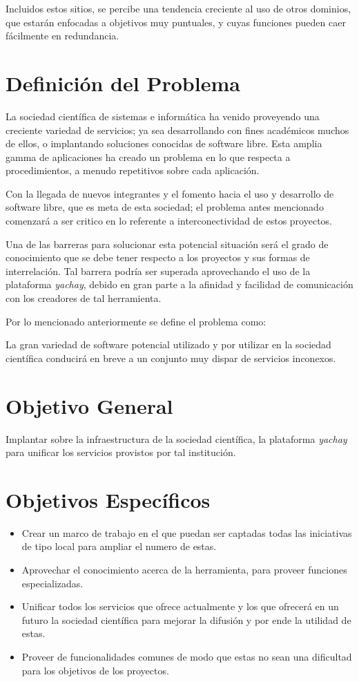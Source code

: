 \documentclass[letter,12pt]{article}
\begin{document}
Incluidos estos sitios, se percibe una tendencia creciente al uso de otros dominios, que estarán 
enfocadas a objetivos muy puntuales, y cuyas funciones pueden caer fácilmente en redundancia.

\section{Definición del Problema}
La sociedad científica de sistemas e informática ha venido proveyendo una creciente variedad de servicios; ya sea desarrollando con fines académicos muchos de ellos, o implantando
soluciones conocidas de software libre. Esta amplia gamma de aplicaciones ha creado un problema en lo que respecta a procedimientos, a menudo repetitivos sobre cada aplicación.

Con la llegada de nuevos integrantes y el fomento hacia el uso y desarrollo de software libre, que
es meta de esta sociedad; el problema antes mencionado comenzará a ser critico en lo referente a
interconectividad de estos proyectos.

Una de las barreras para solucionar esta potencial situación será el grado de conocimiento que se
debe tener respecto a los proyectos y sus formas de interrelación. Tal barrera podría ser superada
aprovechando el uso de la plataforma \emph{yachay}, debido en gran parte a la afinidad y facilidad
de comunicación con los creadores de tal herramienta.

Por lo mencionado anteriormente se define el problema como:

La gran variedad de software potencial utilizado y por utilizar en la sociedad científica conducirá 
en breve a un conjunto muy dispar de servicios inconexos.

\section{Objetivo General}
Implantar sobre la infraestructura de la sociedad científica, la plataforma \emph{yachay} para
unificar los servicios provistos por tal institución.

\section{Objetivos Específicos}
\begin{itemize}
\item Crear un marco de trabajo en el que puedan ser captadas todas las iniciativas de tipo local para ampliar el numero de estas.
\item Aprovechar el conocimiento acerca de la herramienta, para proveer funciones especializadas.
\item Unificar todos los servicios que ofrece actualmente y los que ofrecerá en un futuro la
sociedad científica para mejorar la difusión y por ende la utilidad de estas.
\item Proveer de funcionalidades comunes de modo que estas no sean una dificultad para los objetivos de los proyectos.
\end{itemize}
\end{document}
